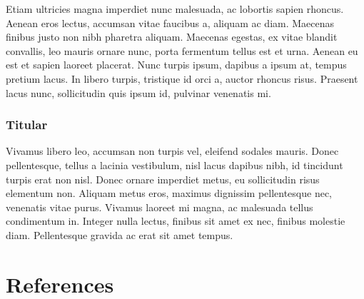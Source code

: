 \documentclass[
  letterpaper,
  DIV=11,
  numbers=noendperiod]{scrreprt}
\newlength{\cslhangindent}
\newlength{\cslentryspacingunit} %
\newenvironment{CSLReferences}[2] %
 {%
  \setlength{\parindent}{0pt}
  \ifodd #1
  \let\oldpar\par
  \def\par{\hangindent=\cslhangindent\oldpar}
  \fi
  \setlength{\parskip}{#2\cslentryspacingunit}
 }%
 {}
\begin{document}
Etiam ultricies magna imperdiet nunc malesuada, ac lobortis sapien
rhoncus. Aenean eros lectus, accumsan vitae faucibus a, aliquam ac diam.
Maecenas finibus justo non nibh pharetra aliquam. Maecenas egestas, ex
vitae blandit convallis, leo mauris ornare nunc, porta fermentum tellus
est et urna. Aenean eu est et sapien laoreet placerat. Nunc turpis
ipsum, dapibus a ipsum at, tempus pretium lacus. In libero turpis,
tristique id orci a, auctor rhoncus risus. Praesent lacus nunc,
sollicitudin quis ipsum id, pulvinar venenatis mi.

\hypertarget{titular-17}{%
\subsection{Titular}\label{titular-17}}

Vivamus libero leo, accumsan non turpis vel, eleifend sodales mauris.
Donec pellentesque, tellus a lacinia vestibulum, nisl lacus dapibus
nibh, id tincidunt turpis erat non nisl. Donec ornare imperdiet metus,
eu sollicitudin risus elementum non. Aliquam metus eros, maximus
dignissim pellentesque nec, venenatis vitae purus. Vivamus laoreet mi
magna, ac malesuada tellus condimentum in. Integer nulla lectus, finibus
sit amet ex nec, finibus molestie diam. Pellentesque gravida ac erat sit
amet tempus.


\hypertarget{references}{%
\chapter*{References}\label{references}}


\hypertarget{refs}{}
\begin{CSLReferences}{0}{0}
\end{CSLReferences}
\end{document}
